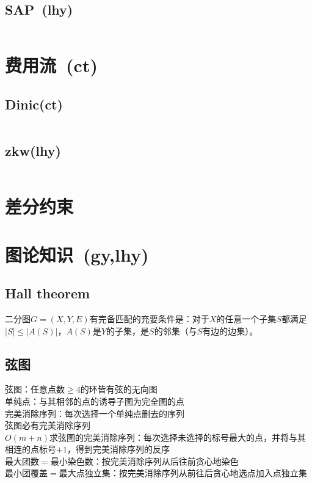 	\subsection*{SAP\ \small(lhy)}
		\inputminted{cpp}{GraphTheory/sap.cpp}
\section{费用流\ \small(ct)}
	\subsection*{Dinic(ct)}
		\inputminted{cpp}{GraphTheory/min_cost_max_flow.cpp}
	\subsection*{zkw(lhy)}
		\inputminted{cpp}{GraphTheory/zkw_min_cost_flow.cpp}
\section{差分约束}
\section{图论知识\ \small(gy,lhy)}
	\subsection*{Hall theorem}
		二分图$ G = (X, Y, E) $有完备匹配的充要条件是：对于$ X $的任意一个子集$ S $都满足$ \left| S \right| \leq \left| A(S) \right| $，$ A(S) $是$ Y $的子集，是$ S $的邻集（与$ S $有边的边集）。
	\subsection*{弦图}
		弦图：任意点数$ \geq 4 $的环皆有弦的无向图
		\\单纯点：与其相邻的点的诱导子图为完全图的点
		\\完美消除序列：每次选择一个单纯点删去的序列
		\\弦图必有完美消除序列
		\\$ O(m + n) $求弦图的完美消除序列：每次选择未选择的标号最大的点，并将与其相连的点标号$ + 1 $，得到完美消除序列的反序
		\\最大团数$ = $最小染色数：按完美消除序列从后往前贪心地染色
		\\最小团覆盖$ = $最大点独立集：按完美消除序列从前往后贪心地选点加入点独立集
